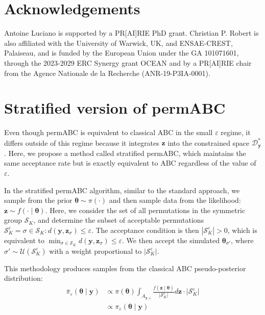 \documentclass[lineno]{biometrika}
\def\dataspace{\mathcal{D}}
\def\obsdata{\mathbf{y}}
\def\param{\boldsymbol{\theta}}
\def\parprop{\boldsymbol{\theta}}
\def\simdata{\mathbf{z}}
\begin{document}
\section*{Acknowledgements}

Antoine Luciano is supported by a PR[AI]RIE PhD grant. Christian P. Robert is also affiliated with the University of Warwick, UK, and ENSAE-CREST, Palaiseau, and is funded by the European Union under the GA 101071601, through the 2023-2029 ERC Synergy grant OCEAN and by a PR[AI]RIE chair from the Agence Nationale de la Recherche (ANR-19-P3IA-0001).

% 




\appendix

\section{Stratified version of permABC}
\label{sec:appendix_strat}

Even though permABC is equivalent to classical ABC in the small $\varepsilon$ regime, it differs outside of this regime because it integrates $\simdata$ into the constrained space $\dataspace_{\obsdata}^*$. Here, we propose a method called stratified permABC, which maintains the same acceptance rate but is exactly equivalent to ABC regardless of the value of $\varepsilon$.

In the stratified permABC algorithm, similar to the standard approach, we sample from the prior $\parprop \sim \pi(\cdot)$ and then sample data from the likelihood: $\simdata \sim f(\cdot \mid \parprop)$. Here, we consider the set of all permutations in the symmetric group $\mathcal{S}_K$, and determine the subset of acceptable permutations $\mathcal S_K^\varepsilon = { \sigma \in \mathcal S_K : d(\obsdata,\simdata_{\sigma}) \leq \varepsilon }$. The acceptance condition is then $\left | \mathcal S_K^\varepsilon \right | > 0$, which is equivalent to $\min_{\sigma \in \mathcal S_K} d(\obsdata,\simdata_{\sigma}) \leq \varepsilon$. We then accept the simulated $\parprop_{\sigma'}$, where $\sigma' \sim \mathcal U(\mathcal S_K^\varepsilon)$ with a weight proportional to $\lvert \mathcal S_K^\varepsilon \rvert$.

This methodology produces samples from the classical ABC pseudo-posterior distribution:
\begin{equation}
    \begin{split}
        \bar \pi_{\varepsilon} (\param \mid \obsdata) & \propto \pi(\param) \int_{A_{\obsdata,\varepsilon}} \frac{f(\simdata \mid \param)}{\lvert \mathcal S_K^\varepsilon \rvert} d\simdata \cdot \lvert \mathcal S_K^\varepsilon \rvert\\
        & \propto \pi_{\varepsilon} (\param \mid \obsdata)
    \end{split}
\end{equation}
\end{document}
